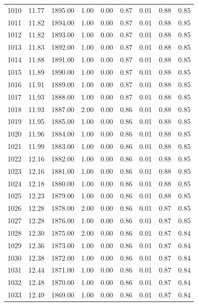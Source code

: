 \documentclass{article}\usepackage[]{graphicx}\usepackage[]{color}
\begin{document}
\begin{longtable}{rrrrrrrrr}
  1010 & 11.77 & 1895.00 & 1.00 & 0.00 & 0.87 & 0.01 & 0.88 & 0.85 \\ 
  1011 & 11.82 & 1894.00 & 1.00 & 0.00 & 0.87 & 0.01 & 0.88 & 0.85 \\ 
  1012 & 11.82 & 1893.00 & 1.00 & 0.00 & 0.87 & 0.01 & 0.88 & 0.85 \\ 
  1013 & 11.83 & 1892.00 & 1.00 & 0.00 & 0.87 & 0.01 & 0.88 & 0.85 \\ 
  1014 & 11.88 & 1891.00 & 1.00 & 0.00 & 0.87 & 0.01 & 0.88 & 0.85 \\ 
  1015 & 11.89 & 1890.00 & 1.00 & 0.00 & 0.87 & 0.01 & 0.88 & 0.85 \\ 
  1016 & 11.91 & 1889.00 & 1.00 & 0.00 & 0.87 & 0.01 & 0.88 & 0.85 \\ 
  1017 & 11.93 & 1888.00 & 1.00 & 0.00 & 0.87 & 0.01 & 0.88 & 0.85 \\ 
  1018 & 11.93 & 1887.00 & 2.00 & 0.00 & 0.86 & 0.01 & 0.88 & 0.85 \\ 
  1019 & 11.95 & 1885.00 & 1.00 & 0.00 & 0.86 & 0.01 & 0.88 & 0.85 \\ 
  1020 & 11.96 & 1884.00 & 1.00 & 0.00 & 0.86 & 0.01 & 0.88 & 0.85 \\ 
  1021 & 11.99 & 1883.00 & 1.00 & 0.00 & 0.86 & 0.01 & 0.88 & 0.85 \\ 
  1022 & 12.16 & 1882.00 & 1.00 & 0.00 & 0.86 & 0.01 & 0.88 & 0.85 \\ 
  1023 & 12.16 & 1881.00 & 1.00 & 0.00 & 0.86 & 0.01 & 0.88 & 0.85 \\ 
  1024 & 12.18 & 1880.00 & 1.00 & 0.00 & 0.86 & 0.01 & 0.88 & 0.85 \\ 
  1025 & 12.23 & 1879.00 & 1.00 & 0.00 & 0.86 & 0.01 & 0.88 & 0.85 \\ 
  1026 & 12.28 & 1878.00 & 2.00 & 0.00 & 0.86 & 0.01 & 0.87 & 0.85 \\ 
  1027 & 12.28 & 1876.00 & 1.00 & 0.00 & 0.86 & 0.01 & 0.87 & 0.85 \\ 
  1028 & 12.30 & 1875.00 & 2.00 & 0.00 & 0.86 & 0.01 & 0.87 & 0.84 \\ 
  1029 & 12.36 & 1873.00 & 1.00 & 0.00 & 0.86 & 0.01 & 0.87 & 0.84 \\ 
  1030 & 12.38 & 1872.00 & 1.00 & 0.00 & 0.86 & 0.01 & 0.87 & 0.84 \\ 
  1031 & 12.44 & 1871.00 & 1.00 & 0.00 & 0.86 & 0.01 & 0.87 & 0.84 \\ 
  1032 & 12.48 & 1870.00 & 1.00 & 0.00 & 0.86 & 0.01 & 0.87 & 0.84 \\ 
  1033 & 12.49 & 1869.00 & 1.00 & 0.00 & 0.86 & 0.01 & 0.87 & 0.84 \\ 

\end{longtable}
\end{document}

